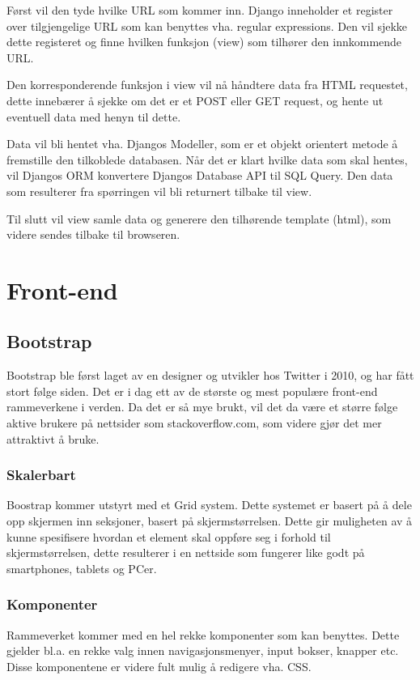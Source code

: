 Først vil den tyde hvilke URL som kommer inn. Django inneholder et register over tilgjengelige URL som kan benyttes vha. regular expressions. Den vil sjekke dette registeret og finne hvilken funksjon (view) som tilhører den innkommende URL.

Den korresponderende funksjon i view vil nå håndtere data fra HTML requestet, dette innebærer å sjekke om det er et POST eller GET request, og hente ut eventuell data med henyn til dette. 

Data vil bli hentet vha. Djangos Modeller, som er et objekt orientert metode å fremstille den tilkoblede databasen. Når det er klart hvilke data som skal hentes, vil Djangos ORM konvertere Djangos Database API til SQL Query. Den data som resulterer fra spørringen vil bli returnert tilbake til view.

Til slutt vil view samle data og generere den tilhørende template (html), som videre sendes tilbake til browseren.



\section{Front-end}
\subsection{Bootstrap}
Bootstrap ble først laget av en designer og utvikler hos Twitter i 2010, og har fått stort følge siden. Det er i dag ett av de største og mest populære front-end rammeverkene i verden. Da det er så mye brukt, vil det da være et større følge aktive brukere på nettsider som stackoverflow.com, som videre gjør det mer attraktivt å bruke.

\subsubsection*{Skalerbart}
Boostrap kommer utstyrt med et Grid system. Dette systemet er basert på å dele opp skjermen inn seksjoner, basert på skjermstørrelsen. Dette gir muligheten av å kunne spesifisere hvordan et element skal oppføre seg i forhold til skjermstørrelsen, dette resulterer i en nettside som fungerer like godt på smartphones, tablets og PCer.

\subsubsection*{Komponenter}
Rammeverket kommer med en hel rekke komponenter som kan benyttes.  Dette gjelder bl.a. en rekke valg innen navigasjonsmenyer, input bokser, knapper etc. Disse komponentene er videre fult mulig å redigere vha. CSS.

